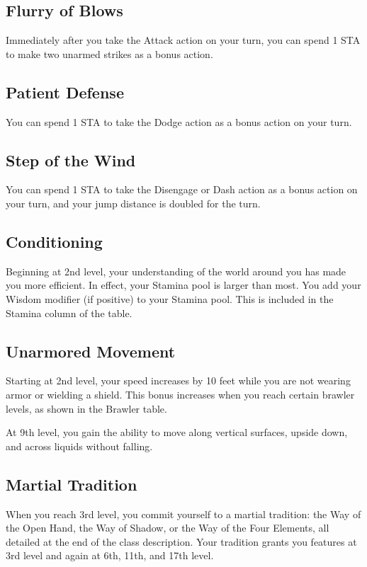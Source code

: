 \subsection{Flurry of Blows}

Immediately after you take the Attack action on your turn, you can spend 1 STA to make two unarmed strikes as a bonus action.

\subsection{Patient Defense}

You can spend 1 STA to take the Dodge action as a bonus action on your turn.

\subsection{Step of the Wind}

You can spend 1 STA to take the Disengage or Dash action as a bonus action on your turn, and your jump distance is doubled for the turn.

\subsection{Conditioning}
Beginning at 2nd level, your understanding of the world around you has made you more efficient. In effect, your Stamina pool is larger than most. You add your Wisdom modifier (if positive) to your Stamina pool. This is included in the Stamina column of the  table. 

\subsection{Unarmored Movement}

Starting at 2nd level, your speed increases by 10 feet while you are not wearing armor or wielding a shield. This bonus increases when you reach certain brawler levels, as shown in the Brawler table.

At 9th level, you gain the ability to move along vertical surfaces, upside down, and across liquids without falling.

\subsection{Martial Tradition}

When you reach 3rd level, you commit yourself to a martial tradition: the Way of the Open Hand, the Way of Shadow, or the Way of the Four Elements, all detailed at the end of the class description. Your tradition grants you features at 3rd level and again at 6th, 11th, and 17th level.


